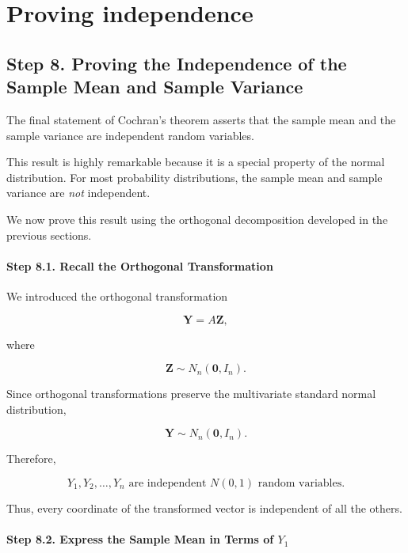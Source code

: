 \documentclass[11pt]{article}
\begin{document}
	\section{Proving independence}
	\begin{mdframed}[
		linewidth=0.8pt,
		roundcorner=6pt,
		backgroundcolor=gray!5,
		linecolor=gray!60,
		innertopmargin=10pt,
		innerbottommargin=10pt,
		innerleftmargin=10pt,
		innerrightmargin=10pt
		]
		
		\subsection*{Step 8. Proving the Independence of the Sample Mean and Sample Variance}
		
		The final statement of Cochran's theorem asserts that the sample mean and
		the sample variance are independent random variables.
		
		This result is highly remarkable because it is a special property of the
		normal distribution. For most probability distributions, the sample mean
		and sample variance are \emph{not} independent.
		
		We now prove this result using the orthogonal decomposition developed in
		the previous sections.
		
		\paragraph{Step 8.1. Recall the Orthogonal Transformation}
		
		We introduced the orthogonal transformation
		
		\[
		\mathbf Y
		=
		A\mathbf Z,
		\]
		
		where
		
		\[
		\mathbf Z
		\sim
		N_n(\mathbf0,I_n).
		\]
		
		Since orthogonal transformations preserve the multivariate standard normal
		distribution,
		
		\[
		\mathbf Y
		\sim
		N_n(\mathbf0,I_n).
		\]
		
		Therefore,
		
		\[
		\boxed{
			Y_1,Y_2,\ldots,Y_n
			\text{ are independent }
			N(0,1)
			\text{ random variables.}
		}
		\]
		
		Thus, every coordinate of the transformed vector is independent of all the
		others.
		
		\paragraph{Step 8.2. Express the Sample Mean in Terms of $Y_1$}
		

\end{mdframed}
\end{document}
